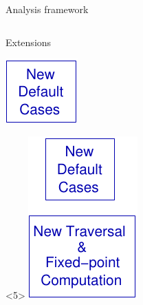 \begin{frame}[t]{Analysis framework}
\begin{columns}[T]
\begin{column}{5cm}
\begin{onlyenv}
\begin{block}{Extensions}
\begin{center}
\begin{onlyenv}
              \includegraphics{images/analysis_extension2.pdf}
            \end{onlyenv}
            \begin{onlyenv}<5>
              \includegraphics{images/analysis_extension3.pdf}
            \end{onlyenv}
          \end{center}
        \end{block}
      \end{onlyenv}
    \end{column}
  \end{columns}
  
\end{frame}
